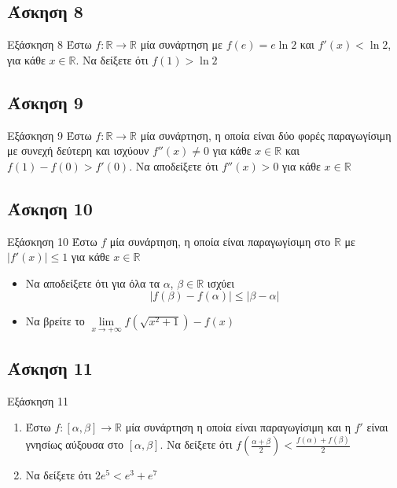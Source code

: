 \documentclass[greek]{beamer}
\begin{document}
\subsection{Άσκηση 8}
\begin{frame}[label=Άσκηση8]{Εξάσκηση 8}
 Έστω $f:\mathbb{R}\to\mathbb{R}$ μία συνάρτηση με $f(e)=e\ln 2$ και $f'(x)<\ln 2$, για κάθε $x\in \mathbb{R}$. Να δείξετε ότι $f(1)>\ln 2$

\end{frame}

\subsection{Άσκηση 9}
\begin{frame}[label=Άσκηση9]{Εξάσκηση 9}
 Έστω $f:\mathbb{R}\to\mathbb{R}$ μία συνάρτηση, η οποία είναι δύο φορές παραγωγίσιμη με συνεχή δεύτερη και ισχύουν $f''(x)\ne 0$ για κάθε $x\in\mathbb{R}$ και $f(1)-f(0)>f'(0)$. Να αποδείξετε ότι $f''(x)>0$ για κάθε $x\in\mathbb{R}$

\end{frame}

\subsection{Άσκηση 10}
\begin{frame}[label=Άσκηση10]{Εξάσκηση 10}
 Έστω $f$ μία συνάρτηση, η οποία είναι παραγωγίσιμη στο $\mathbb{R}$ με $|f'(x)|\le 1$ για κάθε $x\in\mathbb{R}$
 \begin{itemize}
  \item<1-> Να αποδείξετε ότι για όλα τα $α$, $β\in\mathbb{R}$ ισχύει
  $$|f(β)-f(α)|\le |β-α|$$
  \item<2-> Να βρείτε το $\lim\limits_{x \to +\infty}{ f\left( \sqrt{x^2+1} \right)-f(x)  }$
 \end{itemize}
\end{frame}

\subsection{Άσκηση 11}
\begin{frame}[label=Άσκηση11]{Εξάσκηση 11}
  \begin{enumerate}
    \item<1-> Έστω $f:[α,β]\to\mathbb{R}$ μία συνάρτηση η οποία είναι παραγωγίσιμη και η $f'$ είναι γνησίως αύξουσα στο $[α,β]$. Να δείξετε ότι $f\left( \frac{α+β}{2} \right)<\frac{f(α)+f(β)}{2} $
    \item<2-> Να δείξετε ότι $2e^5<e^3+e^7$
  \end{enumerate}

\end{frame}
\end{document}
